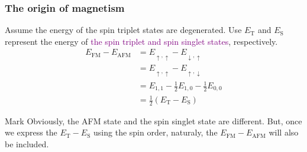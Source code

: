 \documentclass{beamer}
\begin{document}
  \begin{frame}
    \frametitle{The origin of magnetism}
    Assume the energy of the spin triplet states are degenerated. Use \(E_\text{T}
    \) and \(E_\text{S}\) represent the energy of \textcolor{purple}{the spin triplet and spin singlet states}, respectively.
    \begin{equation}
      \begin{aligned}
        E_{\text{FM}} - E_{\text{AFM}} &= E_{\uparrow,\uparrow} - E_{\downarrow,\uparrow}\\
        &= E_{\uparrow,\uparrow} - E_{\uparrow,\downarrow}\\
        &= E_{1,1} - \frac{1}{2}E_{1,0} - \frac{1}{2}E_{0,0}\\
        &= \frac{1}{2}(E_\text{T} - E_\text{S})
      \end{aligned}
    \end{equation}
    \begin{block}{Mark}
      Obviously, the AFM state and the spin singlet state are different. But, once we express the \(E_\text{T} - E_\text{S}\) using the spin order, naturaly, the \(E_{\text{FM}} - E_{\text{AFM}}\) will also be included.
    \end{block}
  \end{frame}
\end{document}
